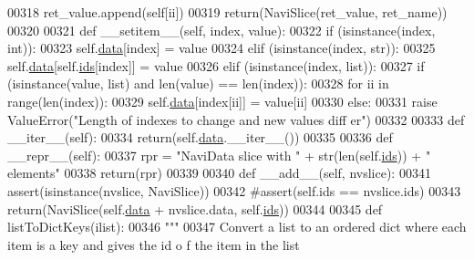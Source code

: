 \begin{DoxyCode}
00318                 ret\_value.append(self[ii])
00319             \textcolor{keywordflow}{return}(NaviSlice(ret\_value, ret\_name))
00320 
00321     \textcolor{keyword}{def }\_\_setitem\_\_(self, index, value):
00322         \textcolor{keywordflow}{if} (isinstance(index, int)):
00323             self.\hyperlink{classnavicom_1_1navidata_1_1NaviSlice_a21ac86b9fbcb4ffc952782983690af5f}{data}[index] = value
00324         \textcolor{keywordflow}{elif} (isinstance(index, str)):
00325             self.\hyperlink{classnavicom_1_1navidata_1_1NaviSlice_a21ac86b9fbcb4ffc952782983690af5f}{data}[self.\hyperlink{classnavicom_1_1navidata_1_1NaviSlice_abc8769a0168ce54ee35624363deb0bcd}{ids}[index]] = value
00326         \textcolor{keywordflow}{elif} (isinstance(index, list)):
00327             \textcolor{keywordflow}{if} (isinstance(value, list) \textcolor{keywordflow}{and} len(value) == len(index)):
00328                 \textcolor{keywordflow}{for} ii \textcolor{keywordflow}{in} range(len(index)):
00329                     self.\hyperlink{classnavicom_1_1navidata_1_1NaviSlice_a21ac86b9fbcb4ffc952782983690af5f}{data}[index[ii]] = value[ii]
00330             \textcolor{keywordflow}{else}:
00331                 \textcolor{keywordflow}{raise} ValueError(\textcolor{stringliteral}{"Length of indexes to change and new values diff
      er"})
00332 
00333     \textcolor{keyword}{def }\_\_iter\_\_(self):
00334         \textcolor{keywordflow}{return}(self.\hyperlink{classnavicom_1_1navidata_1_1NaviSlice_a21ac86b9fbcb4ffc952782983690af5f}{data}.\_\_iter\_\_())
00335 
00336     \textcolor{keyword}{def }\_\_repr\_\_(self):
00337         rpr = \textcolor{stringliteral}{"NaviData slice with "} + str(len(self.\hyperlink{classnavicom_1_1navidata_1_1NaviSlice_abc8769a0168ce54ee35624363deb0bcd}{ids})) + \textcolor{stringliteral}{" elements"}
00338         \textcolor{keywordflow}{return}(rpr)
00339 
00340     \textcolor{keyword}{def }\_\_add\_\_(self, nvslice):
00341         \textcolor{keyword}{assert}(isinstance(nvslice, NaviSlice))
00342         \textcolor{comment}{#assert(self.ids == nvslice.ids)}
00343         \textcolor{keywordflow}{return}(NaviSlice(self.\hyperlink{classnavicom_1_1navidata_1_1NaviSlice_a21ac86b9fbcb4ffc952782983690af5f}{data} + nvslice.data, self.\hyperlink{classnavicom_1_1navidata_1_1NaviSlice_abc8769a0168ce54ee35624363deb0bcd}{ids}))
00344 
00345 \textcolor{keyword}{def }listToDictKeys(ilist):
00346     \textcolor{stringliteral}{"""}
00347 \textcolor{stringliteral}{    Convert a list to an ordered dict where each item is a key and gives the id o
      f the item in the list}

\end{DoxyCode}
